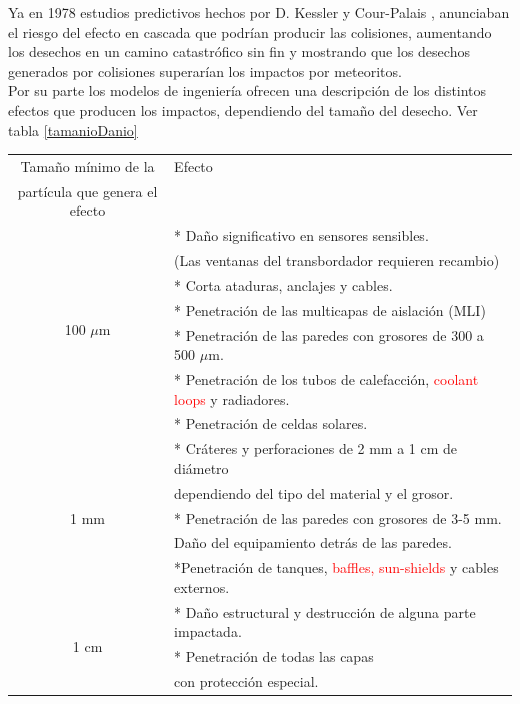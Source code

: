 Ya en 1978  estudios predictivos hechos por D. Kessler y Cour-Palais
 \cite{kessler0}, anunciaban el riesgo del efecto en cascada que podr\'ian producir las colisiones, aumentando los desechos en un camino catastr\'ofico sin fin y mostrando que los desechos generados por colisiones superar\'ian los impactos por meteoritos.\\
 
 Por su parte los modelos de ingenier\'ia ofrecen una descripci\'on de los distintos efectos que producen los impactos, dependiendo del tama\~no del desecho. Ver tabla \ref{tamanioDanio}\\
 
 \begin{table}[h]
\centering
\begin{tabular}[c]{|c l|}
\hline
\hline
Tama\~no m\'inimo de la  &    Efecto\\
part\'icula que genera el efecto & \\
\hline
\hline
\multirow{ 7}{*}{100 $\mu$m }& * Da\~no significativo en sensores sensibles.\\
& (Las ventanas del transbordador requieren recambio)\\
& * Corta ataduras, anclajes y cables.\\
& * Penetraci\'on de las multicapas de aislaci\'on (MLI)\\
& * Penetraci\'on de las paredes con grosores de 300 a 500 $\mu$m.\\
& * Penetraci\'on de los tubos de calefacci\'on, \textcolor{red}{coolant loops} y radiadores.\\
& * Penetraci\'on de celdas solares.\\
\hline 
\multirow{ 5}{*}{1 mm }& * Cr\'ateres y perforaciones de 2 mm a 1 cm de di\'ametro\\
& dependiendo del tipo del material y el grosor.\\
& * Penetraci\'on de las paredes con grosores de 3-5 mm.\\
& Da\~no del equipamiento detr\'as de las paredes.\\
& *Penetraci\'on de tanques, \textcolor{red}{baffles, sun-shields} y cables externos.\\
\hline
\multirow{ 3}{*}{1 cm } & * Da\~no estructural y destrucci\'on de alguna parte impactada.\\
& * Penetraci\'on de todas las capas\\ %
& con protecci\'on especial.\\

\end{tabular}
\end{table}
